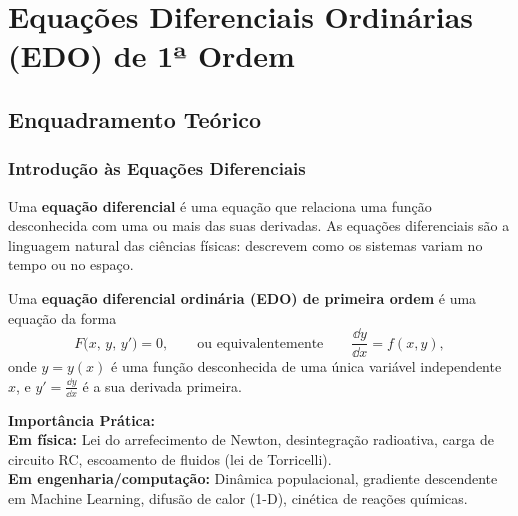 
\chapter{Equações Diferenciais Ordinárias (EDO) de 1ª Ordem}

\section{Enquadramento Teórico}

\subsection{Introdução às Equações Diferenciais}

Uma \textbf{equação diferencial} é uma equação que relaciona uma função desconhecida com uma ou mais das suas derivadas. As equações diferenciais são a linguagem natural das ciências físicas: descrevem como os sistemas variam no tempo ou no espaço.

\begin{defbox}[title={EDO de Primeira Ordem}]
  Uma \textbf{equação diferencial ordinária (EDO) de primeira ordem} é uma equação da forma
  \[
    F\!\bigl(x,\, y,\, y'\bigr) = 0,
    \qquad\text{ou equivalentemente}\qquad
    \frac{\dd y}{\dd x} = f(x, y),
  \]
  onde $y = y(x)$ é uma função desconhecida de uma única variável independente $x$, e $y' = \frac{\dd y}{\dd x}$ é a sua derivada primeira.
\end{defbox}

\begin{notebox}
  \textbf{Importância Prática:} \\
  \textbf{Em física:} Lei do arrefecimento de Newton, desintegração radioativa, carga de circuito RC, escoamento de fluidos (lei de Torricelli).\\
  \textbf{Em engenharia/computação:} Dinâmica populacional, gradiente descendente em Machine Learning, difusão de calor (1-D), cinética de reações químicas.
\end{notebox}

